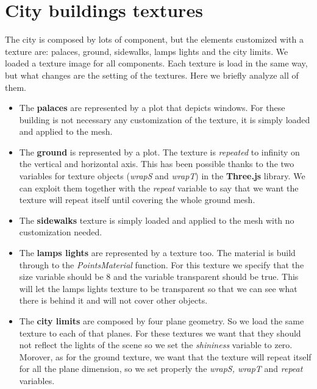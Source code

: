 \documentclass[a4paper, 11pt, titlepage]{report}
\begin{document}
	\section{City buildings textures}
		The city is composed by lots of component, but the elements customized with a texture are: palaces, ground, sidewalks, lamps lights and the city limits. We loaded a texture image for all components. Each texture is load in the same way, but what changes are the setting of the textures. Here we briefly analyze all of them. 
		\begin{itemize}
			\item The \textbf{palaces} are represented by a plot that depicts windows. For these building is not necessary any customization of the texture, it is simply loaded and applied to the mesh.			
			\item The \textbf{ground} is represented by a plot. The texture is \emph{repeated} to infinity on the vertical and horizontal axis. This has been possible thanks to the two variables for texture objects (\emph{wrapS} and \emph{wrapT}) in the \textbf{Three.js} library. We can exploit them together with the \emph{repeat} variable to say that we want the texture will repeat itself until covering the whole ground mesh.
			\item The \textbf{sidewalks} texture is simply loaded and applied to the mesh with no customization needed.
			\item The \textbf{lamps lights} are represented by a texture too. The material is build through to the \emph{PointsMaterial} function. For this texture we specify that the size variable should be 8 and the variable transparent should be true. This will let the lamps lights texture to be transparent so that we can see what there is behind it and will not cover other objects.
			\item The \textbf{city limits} are composed by four plane geometry. So we load the same texture to each of that planes. For these textures we want that they should not reflect the lights of the scene so we set the \emph{shininess} variable to zero. Morover, as for the ground texture, we want that the texture will repeat itself for all the plane dimension, so we set properly the \emph{wrapS, wrapT} and \emph{repeat} variables. 
		\end{itemize}
\end{document}

